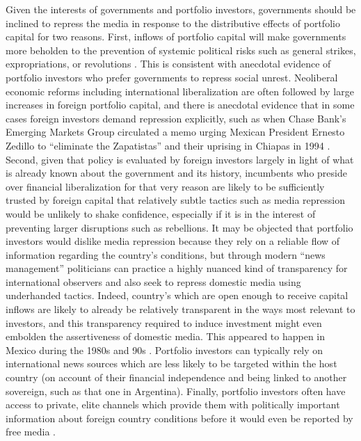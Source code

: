 \documentclass[12pt,a4paper]{article}\usepackage[]{graphicx}\usepackage[]{color}
\begin{document}
Given the interests of governments and portfolio investors, governments should be inclined to repress the media in response to the distributive effects of portfolio capital for two reasons. First, inflows of portfolio capital will make governments more beholden to the prevention of systemic political risks such as general strikes, expropriations, or revolutions \parencite{Clark:1997jg}. This is consistent with anecdotal evidence of portfolio investors who prefer governments to repress social unrest. Neoliberal economic reforms including international liberalization are often followed by large increases in foreign portfolio capital, and there is anecdotal evidence that in some cases foreign investors demand repression explicitly, such as when Chase Bank's Emerging Markets Group circulated a memo urging Mexican President Ernesto Zedillo to “eliminate the Zapatistas” and their uprising in Chiapas in 1994 \parencite{Silverstein:1995wc}. Second, given that policy is evaluated by foreign investors largely in light of what is already known about the government and its history, incumbents who preside over financial liberalization for that very reason are likely to be sufficiently trusted by foreign capital that relatively subtle tactics such as media repression would be unlikely to shake confidence, especially if it is in the interest of preventing larger disruptions such as rebellions. It may be objected that portfolio investors would dislike media repression because they rely on a reliable flow of information regarding the country's conditions, but through modern “news management” politicians can practice a highly nuanced kind of transparency for international observers and also seek to repress domestic media using underhanded tactics. Indeed, country's which are open enough to receive capital inflows are likely to already be relatively transparent in the ways most relevant to investors, and this transparency required to induce investment might even embolden the assertiveness of domestic media. This appeared to happen in Mexico during the 1980s and 90s \parencite{lawson2002building}. Portfolio investors can typically rely on international news sources which are less likely to be targeted within the host country (on account of their financial independence and being linked to another sovereign, such as that one in Argentina). Finally, portfolio investors often have access to private, elite channels which provide them with politically important information about foreign country conditions before it would even be reported by free media \parencite{Dube:2011ir}.
\end{document}
